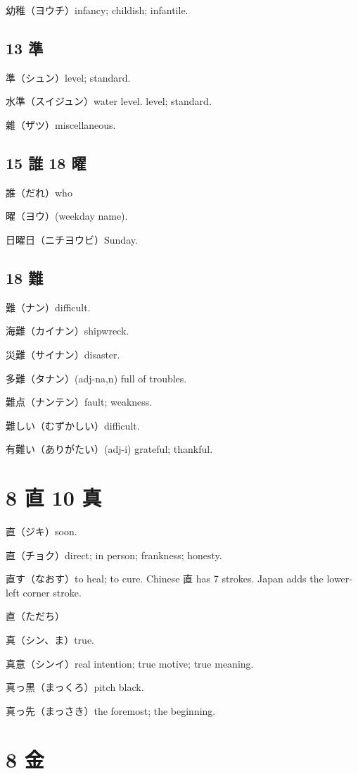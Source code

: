 幼稚（ヨウチ）infancy; childish; infantile.

\subsection{13 準}

準（シュン）level; standard.

水準（スイジュン）water level. level; standard.

雜（ザツ）miscellaneous.

\subsection{15 誰 18 曜}

誰（だれ）who

曜（ヨウ）(weekday name).

日曜日（ニチヨウビ）Sunday.

\subsection{18 難}

難（ナン）difficult.

海難（カイナン）shipwreck.

災難（サイナン）disaster.

多難（タナン）(adj-na,n) full of troubles.

難点（ナンテン）fault; weakness.

難しい（むずかしい）difficult.

有難い（ありがたい）(adj-i) grateful; thankful.

\section{8 直 10 真}

直（ジキ）soon.

直（チョク）direct; in person; frankness; honesty.

直す（なおす）to heal; to cure.
Chinese 直 has 7 strokes.
Japan adds the lower-left corner stroke.

直（ただち）

真（シン、ま）true.

真意（シンイ）real intention; true motive; true meaning.

真っ黒（まっくろ）pitch black.

真っ先（まっさき）the foremost; the beginning.

\section{8 金}

